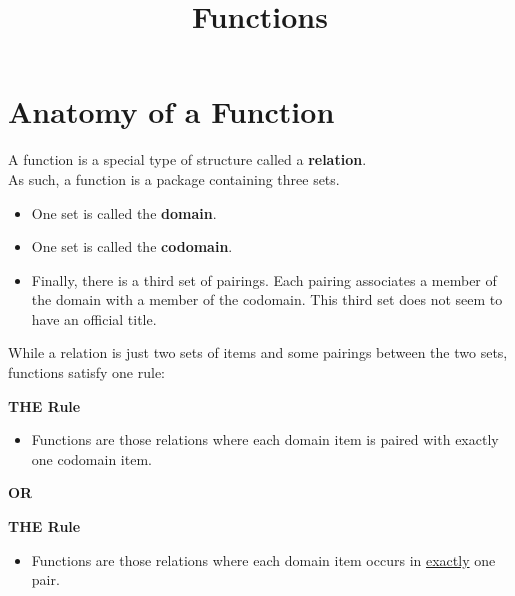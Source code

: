 \documentclass{ximera}
\title{Functions}
\begin{document}
\begin{abstract}
\end{abstract}
\maketitle





\section*{Anatomy of a Function}


A function is a special type of structure called a \textbf{\textcolor{blue!55!black}{relation}}.  \\



As such, a function is a package containing three sets. 


\begin{itemize}
\item One set is called the \textbf{\textcolor{purple!85!blue}{domain}}. 
\item One set is called the \textbf{\textcolor{purple!85!blue}{codomain}}.  
\item Finally, there is a third set of pairings.  Each pairing associates a member of the domain with a member of the codomain. This third set does not seem to have an official title.
\end{itemize}


While a relation is just two sets of items and some pairings between the two sets, functions satisfy one rule: \\





\begin{condition} \textbf{\textcolor{purple!85!blue}{THE Rule}}  \\

\begin{itemize}
\item Functions are those relations where each domain item is paired with exactly one codomain item.
\end{itemize}
\end{condition}


\begin{center}
\textbf{OR}
\end{center}


\begin{condition} \textbf{\textcolor{purple!85!blue}{THE Rule}} \\

\begin{itemize}
\item Functions are those relations where each domain item occurs in \underline{exactly} one pair.
\end{itemize}
\end{condition}
\end{document}
